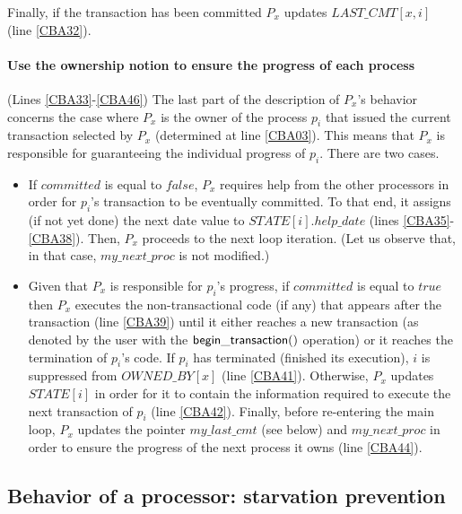 Finally, if the transaction has been committed
$P_x$ updates  $\mathit{LAST\_CMT}[x,i]$  (line \ref{CBA32}).


\paragraph{Use the ownership notion to ensure the progress of each process} 
(Lines \ref{CBA33}-\ref{CBA46}) 
The last part of the description of $P_x$'s behavior  concerns the 
case where  $P_x$ is the owner of the process $p_i$ that issued the 
current transaction selected by $P_x$ (determined at line \ref{CBA03}). 
This means that $P_x$ is responsible for guaranteeing the individual 
progress of $p_i$.  There are two cases. 
%
\begin{itemize}
\item
If $committed$ is  equal to $\mathit{false}$, $P_x$ requires help 
from the other processors in order for $p_i$'s transaction to be eventually 
committed. To that end, it assigns (if not yet done) the next date value 
to $\mathit{STATE}[i].help\_date$  (lines \ref{CBA35}-\ref{CBA38}). 
Then, $P_x$ proceeds to  the next loop iteration.
(Let us observe that, in that case, $my\_next\_proc$ is not  modified.)
%
\item
Given that $P_x$ is responsible for  $p_i$'s progress, 
if $committed$ is  equal to $\mathit{true}$ then $P_x$ executes the  
non-transactional code
(if any) that appears after the transaction (line \ref{CBA39})
until it either reaches a new transaction (as denoted by the user
with the ${\sf begin\_transaction}()$ operation) or it reaches the termination of $p_i$'s code.
If  $p_i$ has terminated (finished its execution), $i$ is 
suppressed from $\mathit{OWNED\_BY}[x]$
(line \ref{CBA41}). Otherwise, $P_x$ updates $\mathit{STATE}[i]$ 
in order for it 
to contain the information required to execute the next transaction of $p_i$ 
(line \ref{CBA42}). 
%
Finally, before re-entering the main loop, $P_x$ 
updates the pointer  $my\_last\_cmt$ (see below) and 
$my\_next\_proc$ in order to ensure the progress of the next 
process it owns (line \ref{CBA44}). 
\end{itemize}

\subsection{Behavior of a processor:  starvation prevention}
\label{sec:starvation-prevention}

